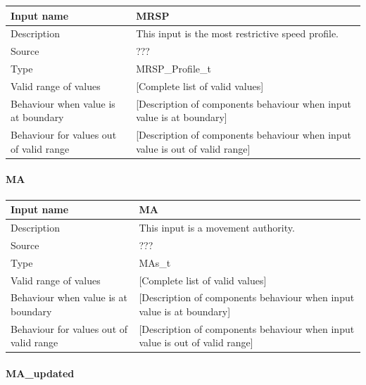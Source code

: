 \begin{longtable}{p{}p{}}
\toprule
Input name				& MRSP \\
\midrule
Description				& This input is the most restrictive speed profile. \\
\midrule
Source					& ??? \\ 
\midrule
Type					& MRSP\_Profile\_t \\
\midrule
Valid range of values	& [Complete list of valid values] \\
\midrule
Behaviour when value is at boundary	& [Description of components behaviour when input value is at boundary] \\
\midrule
Behaviour for values out of valid range	& [Description of components behaviour when input value is out of valid range] \\
\bottomrule
\end{longtable}


\paragraph{MA}

\begin{longtable}{p{}p{}}
\toprule
Input name				& MA \\
\midrule
Description				& This input is a movement authority. \\
\midrule
Source					& ??? \\ 
\midrule
Type					& MAs\_t \\
\midrule
Valid range of values	& [Complete list of valid values] \\
\midrule
Behaviour when value is at boundary	& [Description of components behaviour when input value is at boundary] \\
\midrule
Behaviour for values out of valid range	& [Description of components behaviour when input value is out of valid range] \\
\bottomrule
\end{longtable}


\paragraph{MA\_updated}

